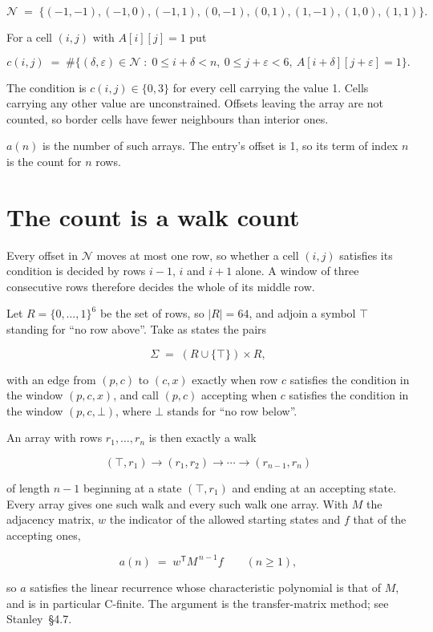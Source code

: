 \documentclass[11pt]{article}
\theoremstyle{definition}
\begin{document}
\[\mathcal{N} \;=\; \{(-1,-1), (-1,0), (-1,1), (0,-1), (0,1), (1,-1), (1,0), (1,1)\}.\]

For a cell $(i,j)$ with $A[i][j] = 1$ put

\[c(i,j) \;=\; \#\bigl\{(\delta,\varepsilon)\in\mathcal{N} \;:\; 0\le i+\delta<n,\ 0\le j+\varepsilon<6,\ A[i+\delta][j+\varepsilon] = 1\bigr\}.\]

The condition is $c(i,j) \in \{0, 3\}$ for every cell carrying the value 1. Cells carrying any other value are unconstrained. Offsets leaving the array are not counted, so border cells have fewer neighbours than interior ones.

$a(n)$ is the number of such arrays. The entry's offset is 1, so its term of index $n$ is the count for $n$ rows.

\section{The count is a walk count}

Every offset in $\mathcal{N}$ moves at most one row, so whether a cell $(i,j)$ satisfies its condition is decided by rows $i-1$, $i$ and $i+1$ alone. A window of three consecutive rows therefore decides the whole of its middle row.

Let $R = \{0,\dots,1\}^{6}$ be the set of rows, so $|R| = 64$, and adjoin a symbol $\top$ standing for ``no row above''. Take as states the pairs

\[\Sigma \;=\; (R \cup \{\top\}) \times R,\]

with an edge from $(p,c)$ to $(c,x)$ exactly when row $c$ satisfies the condition in the window $(p,c,x)$, and call $(p,c)$ accepting when $c$ satisfies the condition in the window $(p,c,\bot)$, where $\bot$ stands for ``no row below''.

An array with rows $r_1,\dots,r_n$ is then exactly a walk

\[(\top,r_1) \to (r_1,r_2) \to \cdots \to (r_{n-1},r_n)\]

of length $n-1$ beginning at a state $(\top,r_1)$ and ending at an accepting state. Every array gives one such walk and every such walk one array. With $M$ the adjacency matrix, $w$ the indicator of the allowed starting states and $f$ that of the accepting ones,

\[a(n) \;=\; w^{\mathsf T} M^{\,n-1} f \qquad (n \ge 1),\]

so $a$ satisfies the linear recurrence whose characteristic polynomial is that of $M$, and is in particular C-finite. The argument is the transfer-matrix method; see Stanley~\S4.7.
\end{document}
